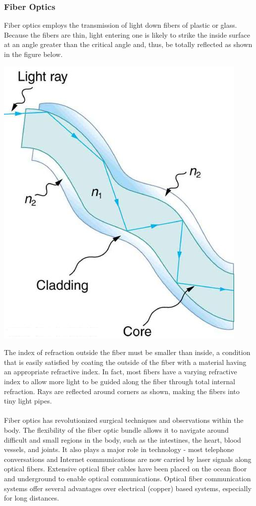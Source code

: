 \documentclass[11pt]{article}
\begin{document}
	\subsubsection*{Fiber Optics}
	Fiber optics employs the transmission of light down fibers of plastic or glass. Because the fibers are thin, light entering one is likely to strike the inside surface at an angle greater than the critical angle and, thus, be totally reflected as shown in the figure below. 
	\begin{center}
		\includegraphics[scale=0.3]{fiber}
	\end{center}
	The index of refraction outside the fiber must be smaller than inside, a condition that is easily satisfied by coating the outside of the fiber with a material having an appropriate refractive index. In fact, most fibers have a varying refractive index to allow more light to be guided along the fiber through total internal refraction. Rays are reflected around corners as shown, making the fibers into tiny light pipes. \\ \\
	Fiber optics has revolutionized surgical techniques and observations within the body. The flexibility of the fiber optic bundle allows it to navigate around difficult and small regions in the body, such as the intestines, the heart, blood vessels, and joints. It also plays a major role in technology - most telephone conversations and Internet communications are now carried by laser signals along optical fibers. Extensive optical fiber cables have been placed on the ocean floor and underground to enable optical communications. Optical fiber communication systems offer several advantages over electrical (copper) based systems, especially for long distances.
\end{document}
